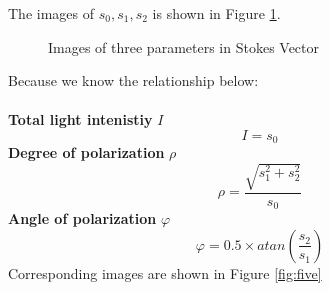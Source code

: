 \documentclass[english]{article}
\begin{document}
The images of $s_{0}, s_{1}, s_{2}$ is shown in Figure \ref{fig:four}.
\begin{figure}[H]
	\centering
	\caption{Images of three parameters in Stokes Vector}
	\label{fig:four}
\end{figure}
Because we know the relationship below:\\
\\
\textbf{Total light intenistiy} $I$
$$
I = s_{0}
$$
\textbf{Degree of polarization} $\rho$
$$
\rho = \frac{\sqrt{s_{1}^2  + s_{2}^2}}{s_{0}}
$$
\textbf{Angle of polarization} $\varphi$
$$
\varphi = 0.5\times atan(\frac{s_{2}}{s_{1}})
$$
Corresponding images are shown in Figure \ref{fig:five}
\end{document}
